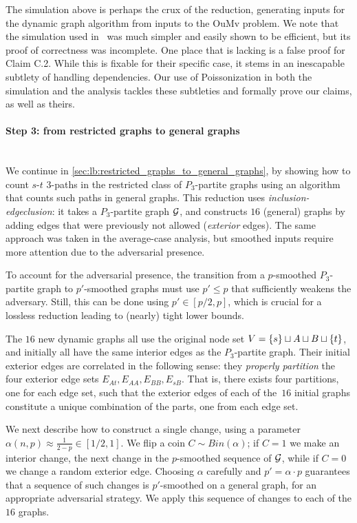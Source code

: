 \documentclass[letter,11pt]{article}
\newcommand{\oumv}{\textnormal{\textsf{OuMv}}\xspace}
\newcommand{\paths}[3]{${#1}$-${#2}$ ${#3}$-paths\xspace}
\begin{document}
\begin{remark}
The simulation above is perhaps the crux of the reduction, generating inputs for the dynamic graph algorithm from inputs to the \oumv problem.
We note that the simulation used in~\cite{HLS22} was much simpler and easily shown to be efficient, but its proof of correctness was incomplete. 
One place that is lacking is a false proof for Claim C.2. While this is fixable for their specific case, it stems in an inescapable subtlety of handling dependencies. 
Our use of Poissonization in both the simulation and the analysis tackles these subtleties and formally prove our claims, as well as theirs.
\end{remark}


\paragraph{Step 3: from restricted graphs to general graphs}~\\
We continue in \cref{sec:lb:restricted_graphs_to_general_graphs}, by showing how to count \paths st3 in the restricted class of $P_3$-partite graphs using an algorithm that counts such paths in general graphs.
This reduction uses \emph{inclusion-edgeclusion}: it takes a $P_3$-partite graph $\mathcal{G}$, and constructs $16$ (general) graphs by adding edges that were previously not allowed (\emph{exterior} edges). The same approach was taken in the average-case analysis, but smoothed inputs require more attention due to the adversarial presence.


To account for the adversarial presence, the transition from a $p$-smoothed $P_3$-partite graph to $p'$-smoothed graphs must use $p' \leq p$ that sufficiently weakens the adversary.
Still, this can be done using $p' \in [p/2, p]$, 
which is crucial for a lossless reduction leading to (nearly) tight lower bounds.


The $16$ new dynamic graphs all use the original node set
$V = \{s\} \sqcup A \sqcup B \sqcup \{t\}$, and initially all have the same interior edges as the $P_3$-partite graph.
Their initial exterior edges are correlated in the following sense: they \emph{properly partition} the four exterior edge sets $E_{At}, E_{AA}, E_{BB}, E_{sB}$.
That is, there exists four partitions, one for each edge set, such that the exterior edges of each of the~$16$ initial graphs 
constitute a unique combination of the parts, one from each edge set.


We next describe how to construct a single change, using a parameter $\alpha(n,p) \approx \frac{1}{2-p}\in[1/2,1]$.
We flip a coin $C\sim Bin(\alpha)$; 
if $C = 1$ we make an interior change, the next change in the $p$-smoothed sequence of $\mathcal{G}$, 
while if $C = 0$ we change a random exterior edge.
Choosing $\alpha$ carefully and $p' = \alpha \cdot p$ guarantees that a sequence of such changes is $p'$-smoothed on a general graph, for an appropriate adversarial strategy. We apply this sequence of changes to each of the $16$ graphs.
\end{document}
